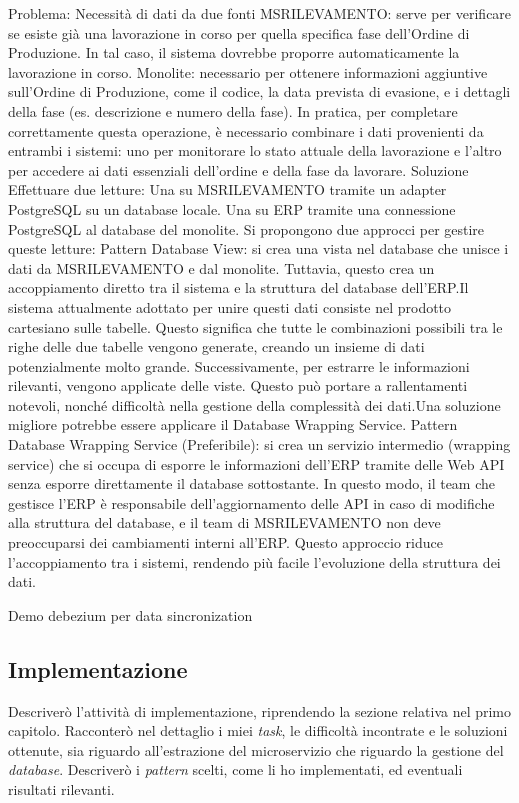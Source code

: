         Problema: Necessità di dati da due fonti
        MSRILEVAMENTO: serve per verificare se esiste già una lavorazione in corso per quella specifica fase dell'Ordine di Produzione. In tal caso, il sistema dovrebbe proporre automaticamente la lavorazione in corso.
        Monolite: necessario per ottenere informazioni aggiuntive sull'Ordine di Produzione, come il codice, la data prevista di evasione, e i dettagli della fase (es. descrizione e numero della fase).
        In pratica, per completare correttamente questa operazione, è necessario combinare i dati provenienti da entrambi i sistemi: uno per monitorare lo stato attuale della lavorazione e l'altro per accedere ai dati essenziali dell'ordine e della fase da lavorare.
        Soluzione
        Effettuare due letture:
        Una su MSRILEVAMENTO tramite un adapter PostgreSQL su un database locale.
        Una su ERP tramite una connessione PostgreSQL al database del monolite.
        Si propongono due approcci per gestire queste letture:
        Pattern Database View: si crea una vista nel database che unisce i dati da MSRILEVAMENTO e dal monolite. Tuttavia, questo crea un accoppiamento diretto tra il sistema e la struttura del database dell'ERP.Il sistema attualmente adottato per unire questi dati consiste nel prodotto cartesiano sulle tabelle. Questo significa che tutte le combinazioni possibili tra le righe delle due tabelle vengono generate, creando un insieme di dati potenzialmente molto grande. Successivamente, per estrarre le informazioni rilevanti, vengono applicate delle viste. Questo può portare a rallentamenti notevoli, nonché difficoltà nella gestione della complessità dei dati.Una soluzione migliore potrebbe essere applicare il Database Wrapping Service.
        Pattern Database Wrapping Service (Preferibile): si crea un servizio intermedio (wrapping service) che si occupa di esporre le informazioni dell'ERP tramite delle Web API senza esporre direttamente il database sottostante. In questo modo, il team che gestisce l'ERP è responsabile dell’aggiornamento delle API in caso di modifiche alla struttura del database, e il team di MSRILEVAMENTO non deve preoccuparsi dei cambiamenti interni all'ERP. Questo approccio riduce l'accoppiamento tra i sistemi, rendendo più facile l'evoluzione della struttura dei dati.

        Demo debezium per data sincronization 

        
        \subsection{Implementazione}
        Descriverò l'attività di implementazione, riprendendo la sezione relativa nel primo capitolo. 
        Racconterò nel dettaglio i miei \textit{task}, le difficoltà incontrate e le soluzioni ottenute, sia riguardo all'estrazione del microservizio che riguardo la gestione del \textit{database}. 
        Descriverò i \textit{pattern} scelti, come li ho implementati, ed eventuali risultati rilevanti. 

